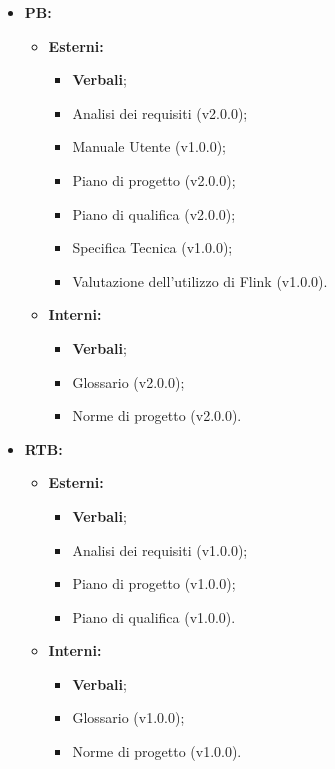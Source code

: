 \documentclass[8pt]{article}
\begin{document}
 \begin{itemize}
    \item \textbf{PB:}
    \begin{itemize}
        \item \textbf{Esterni:}
        \begin{itemize}
            \item \textbf{Verbali};
            \item Analisi dei requisiti (v2.0.0);
            \item Manuale Utente (v1.0.0);
            \item Piano di progetto (v2.0.0);
            \item Piano di qualifica (v2.0.0);
            \item Specifica Tecnica (v1.0.0);
            \item Valutazione dell'utilizzo di Flink (v1.0.0).
        \end{itemize}
        \item \textbf{Interni:}
        \begin{itemize}
            \item \textbf{Verbali};
            \item Glossario (v2.0.0);
            \item Norme di progetto (v2.0.0).
        \end{itemize}
    \end{itemize}
    \item \textbf{RTB:}
    \begin{itemize}
        \item \textbf{Esterni:}
        \begin{itemize}
            \item \textbf{Verbali};
            \item Analisi dei requisiti (v1.0.0);
            \item Piano di progetto (v1.0.0);
            \item Piano di qualifica (v1.0.0).
        \end{itemize}
        \item \textbf{Interni:}
        \begin{itemize}
            \item \textbf{Verbali};
            \item Glossario (v1.0.0);
            \item Norme di progetto (v1.0.0).
        \end{itemize}
    \end{itemize}

\end{itemize}
\end{document}
